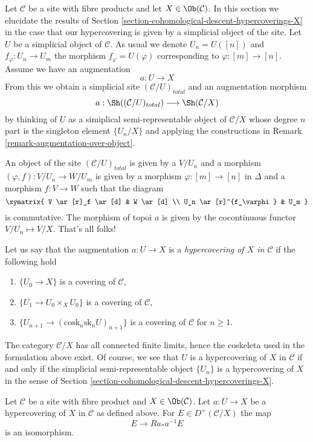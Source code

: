 \noindent
Let $\mathcal{C}$ be a site with fibre products and
let $X \in \Ob(\mathcal{C})$.
In this section we elucidate the results of
Section \ref{section-cohomological-descent-hypercoverings-X}
in the case that our hypercovering is given by
a simplicial object of the site.
Let $U$ be a simplicial object of $\mathcal{C}$.
As usual we denote $U_n = U([n])$ and $f_\varphi : U_n \to U_m$
the morphism $f_\varphi = U(\varphi)$ corresponding to
$\varphi : [m] \to [n]$.
Assume we have an augmentation
$$
a : U \to X
$$
From this we obtain a simplicial site $(\mathcal{C}/U)_{total}$
and an augmentation morphism
$$
a : \Sh((\mathcal{C}/U)_{total}) \longrightarrow \Sh(\mathcal{C}/X)
$$
by thinking of $U$ as a simiplical semi-representable
object of $\mathcal{C}/X$ whose degree $n$ part is the singleton
element $\{U_n/X\}$ and applying the constructions in
Remark \ref{remark-augmentation-over-object}.

\medskip\noindent
An object of the site $(\mathcal{C}/U)_{total}$ is given by
a $V/U_n$ and a morphism $(\varphi, f) : V/U_n \to W/U_m$ is given
by a morphism $\varphi : [m] \to [n]$ in $\Delta$ and a morphism
$f : V \to W$ such that the diagram
$$
\xymatrix{
V \ar[r]_f \ar[d] & W \ar[d] \\
U_n \ar[r]^{f_\varphi} & U_m
}
$$
is commutative. The morphism of topoi $a$ is given by the cocontinuous
functor $V/U_n \mapsto V/X$. That's all folks!

\medskip\noindent
Let us say that the augmentation $a : U \to X$ is a
{\it hypercovering of $X$ in $\mathcal{C}$}
if the following hold
\begin{enumerate}
\item $\{U_0 \to X\}$ is a covering of $\mathcal{C}$,
\item $\{U_1 \to U_0 \times_X U_0\}$ is a covering of $\mathcal{C}$,
\item $\{U_{n + 1} \to (\text{cosk}_n\text{sk}_n U)_{n + 1}\}$
is a covering of $\mathcal{C}$ for $n \geq 1$.
\end{enumerate}
The category $\mathcal{C}/X$ has all connected finite limits, hence the
coskeleta used in the formulation above exist. Of course, we see
that $U$ is a hypercovering of $X$ in $\mathcal{C}$ if and only if
the simplicial semi-representable object $\{U_n\}$ is a hypercovering of $X$
in the sense of Section \ref{section-cohomological-descent-hypercoverings-X}.

\begin{lemma}
\label{lemma-hypercovering-X-simple-descent-bounded-abelian}
Let $\mathcal{C}$ be a site with fibre product and $X \in \Ob(\mathcal{C})$.
Let $a : U \to X$ be a hypercovering of $X$ in $\mathcal{C}$ as defined above.
For $E \in D^+(\mathcal{C}/X)$ the map
$$
E \longrightarrow Ra_*a^{-1}E
$$
is an isomorphism.
\end{lemma}

